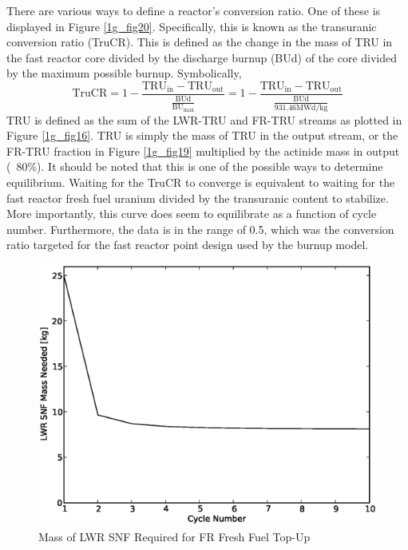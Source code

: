 There are various ways to define a reactor's conversion ratio.  One of these is displayed in Figure 
\ref{1g_fig20}.  Specifically, this is known as the transuranic conversion ratio (TruCR).  
This is defined as the change in the mass of TRU in the fast reactor core divided by the 
discharge burnup (BUd) of the core divided by the maximum possible burnup.  Symbolically, 
\begin{equation}
\label{1g_tru_cr}
\mbox{TruCR} = 1 - \frac{\mbox{TRU}_{\mbox{in}} - \mbox{TRU}_{\mbox{out}}}{\frac{\mbox{BUd}}{\mbox{BU}_{\mbox{max}}}}
             = 1 - \frac{\mbox{TRU}_{\mbox{in}} - \mbox{TRU}_{\mbox{out}}}{\frac{\mbox{BUd}}{931.46 \mbox{MWd/kg}}}
\end{equation}
TRU is defined as the sum of the LWR-TRU and FR-TRU streams as plotted in 
Figure \ref{1g_fig16}.  TRU is simply the mass of TRU in the output stream, 
or the FR-TRU fraction in Figure \ref{1g_fig19} multiplied by the actinide mass in output (~80\%).  
It should be noted that this is one of the possible ways to determine equilibrium.  
Waiting for the TruCR to converge is equivalent to waiting for the fast reactor fresh fuel 
uranium divided by the transuranic content to stabilize.  More importantly, this curve does 
seem to equilibrate as a function of cycle number.  Furthermore, the data is in the range of 0.5, 
which was the conversion ratio targeted for the fast reactor point design used by the burnup model. 

\begin{figure}[htbp]
\caption{Mass of LWR SNF Required for FR Fresh Fuel Top-Up}
\label{1g_fig21}
\begin{center}
\includegraphics[scale=0.5]{one_group_method/figs/Fig21.eps}
\end{center}
\end{figure}

